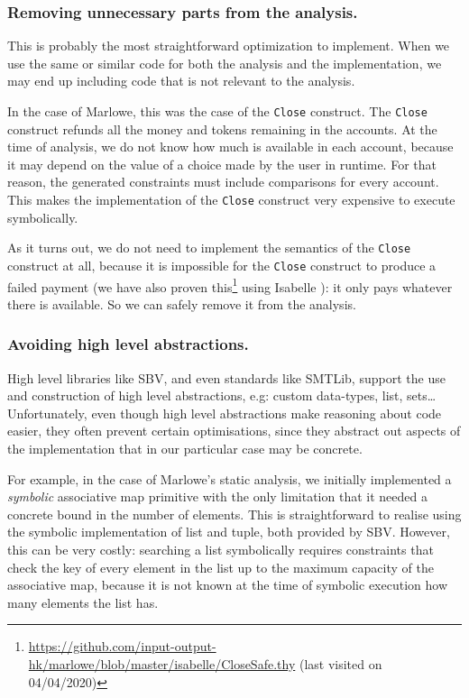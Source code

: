 \documentclass[english,runningheads]{llncs}
\begin{document}
\subsubsection{Removing unnecessary parts from the analysis.}

This is probably the most straightforward optimization to implement.
When we use the same or similar code for both the analysis and the
implementation, we may end up including code that is not relevant
to the analysis.

In the case of Marlowe, this was the case of the \texttt{Close} construct.
The \texttt{Close} construct refunds all the money and tokens remaining
in the accounts. At the time of analysis, we do not know how much
is available in each account, because it may depend on the value of
a choice made by the user in runtime. For that reason, the generated
constraints must include comparisons for every account. This makes
the implementation of the \texttt{Close} construct very expensive
to execute symbolically.

As it turns out, we do not need to implement the semantics of the
\texttt{Close} construct at all, because it is impossible for the
\texttt{Close} construct to produce a failed payment
(we have also proven this\footnote{\url{https://github.com/input-output-hk/marlowe/blob/master/isabelle/CloseSafe.thy} (last visited on 04/04/2020)} using Isabelle \cite{nipkow2002isabelle}): it only pays whatever there is available.
So we can safely remove it from the analysis.

\subsubsection{Avoiding high level abstractions.}

High level libraries like SBV, and even standards like SMTLib, support
the use and construction of high level abstractions,
e.g: custom data-types, list, sets\dots{} Unfortunately, even though
high level abstractions make reasoning about code easier, they often
prevent certain optimisations, since they abstract out aspects of
the implementation that in our particular case may be concrete.

For example, in the case of Marlowe's static analysis, we initially
implemented a \emph{symbolic} associative map primitive with the only limitation
that it needed a concrete bound in the number of elements. This is
straightforward to realise using the symbolic implementation of list
and tuple, both provided by SBV. However, this can be very costly:
searching a list symbolically requires constraints that check
the key of every element in the list up to the maximum capacity of
the associative map, because it is not known at the time of symbolic
execution how many elements the list has.
\end{document}
